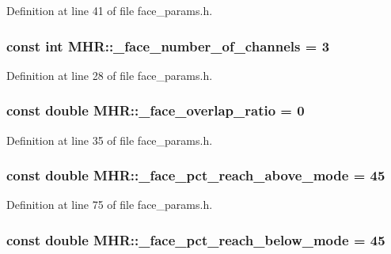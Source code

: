 Definition at line 41 of file face\+\_\+params.\+h.

\hypertarget{namespace_m_h_r_a1af8c23e0ffae759111c964d2369a13b}{
\subsubsection[{\+\_\+face\+\_\+number\+\_\+of\+\_\+channels}]{\setlength{\rightskip}{0pt plus 5cm}const int M\+H\+R\+::\+\_\+face\+\_\+number\+\_\+of\+\_\+channels = 3}}\label{namespace_m_h_r_a1af8c23e0ffae759111c964d2369a13b}


Definition at line 28 of file face\+\_\+params.\+h.

\hypertarget{namespace_m_h_r_ab6430d316d9d82ce08b7d35fda6ba14e}{
\subsubsection[{\+\_\+face\+\_\+overlap\+\_\+ratio}]{\setlength{\rightskip}{0pt plus 5cm}const double M\+H\+R\+::\+\_\+face\+\_\+overlap\+\_\+ratio = 0}}\label{namespace_m_h_r_ab6430d316d9d82ce08b7d35fda6ba14e}


Definition at line 35 of file face\+\_\+params.\+h.

\hypertarget{namespace_m_h_r_a50b60319fb33591915a63ce9b618a18c}{
\subsubsection[{\+\_\+face\+\_\+pct\+\_\+reach\+\_\+above\+\_\+mode}]{\setlength{\rightskip}{0pt plus 5cm}const double M\+H\+R\+::\+\_\+face\+\_\+pct\+\_\+reach\+\_\+above\+\_\+mode = 45}}\label{namespace_m_h_r_a50b60319fb33591915a63ce9b618a18c}


Definition at line 75 of file face\+\_\+params.\+h.

\hypertarget{namespace_m_h_r_ac4235bc51ec51e261f5822920a5886b0}{
\subsubsection[{\+\_\+face\+\_\+pct\+\_\+reach\+\_\+below\+\_\+mode}]{\setlength{\rightskip}{0pt plus 5cm}const double M\+H\+R\+::\+\_\+face\+\_\+pct\+\_\+reach\+\_\+below\+\_\+mode = 45}}\label{namespace_m_h_r_ac4235bc51ec51e261f5822920a5886b0}



